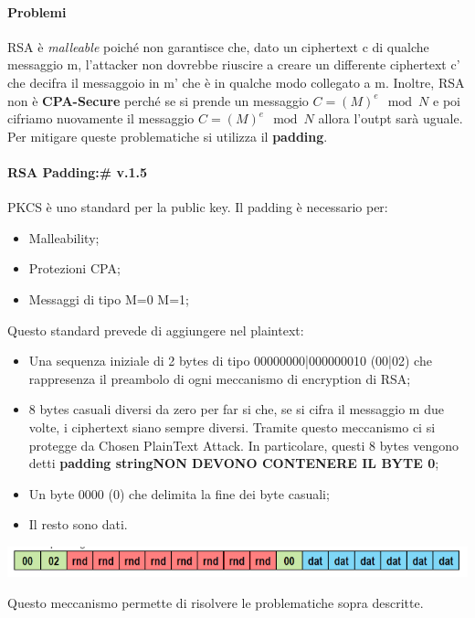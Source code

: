 \documentclass{book}
\theoremstyle{remark}
\begin{document}
\paragraph{Problemi}
RSA è \emph{malleable} poiché non garantisce che, dato un ciphertext c di qualche messaggio m, l'attacker non dovrebbe riuscire a creare un differente ciphertext c' che decifra il messaggoio in m' che è in qualche modo collegato a m\@.\newline
Inoltre, RSA non è \textbf{CPA-Secure} perché se si prende un messaggio \(C=(M)^e \mod{N}\) e poi cifriamo nuovamente il messaggio \(C=(M)^e \mod{N}\) allora l'outpt sarà uguale\@.
Per mitigare queste problematiche si utilizza il \textbf{padding}\@.
\paragraph{RSA Padding:\@PKCS \# v\@.1\@.5}
PKCS è uno standard per la public key\@. Il padding è necessario per:\begin{itemize}
	\item Malleability;\@
	\item Protezioni CPA;\@
	\item Messaggi di tipo M=0 M=1;\@
\end{itemize}
Questo standard prevede di aggiungere nel plaintext:\begin{itemize}
	\item Una sequenza iniziale di 2 bytes di tipo 00000000|000000010 (00|02) che rappresenza il preambolo di ogni meccanismo di encryption di RSA;\@
	\item 8 bytes casuali diversi da zero per far si che, se si cifra il messaggio m due volte, i ciphertext siano sempre diversi\@. Tramite questo meccanismo ci si protegge da Chosen PlainText Attack\@. In particolare, questi 8 bytes vengono detti \textbf{padding string}\textbf{NON DEVONO CONTENERE IL BYTE 0};\@
	\item Un byte 0000 (0) che delimita la fine dei byte casuali;\@
	\item Il resto sono dati\@.
\end{itemize}\begin{center}
	\includegraphics[scale=0.6]{2021-12-10-18-50-55.png}
\end{center}
Questo meccanismo permette di risolvere le problematiche sopra descritte\@.
\end{document}

